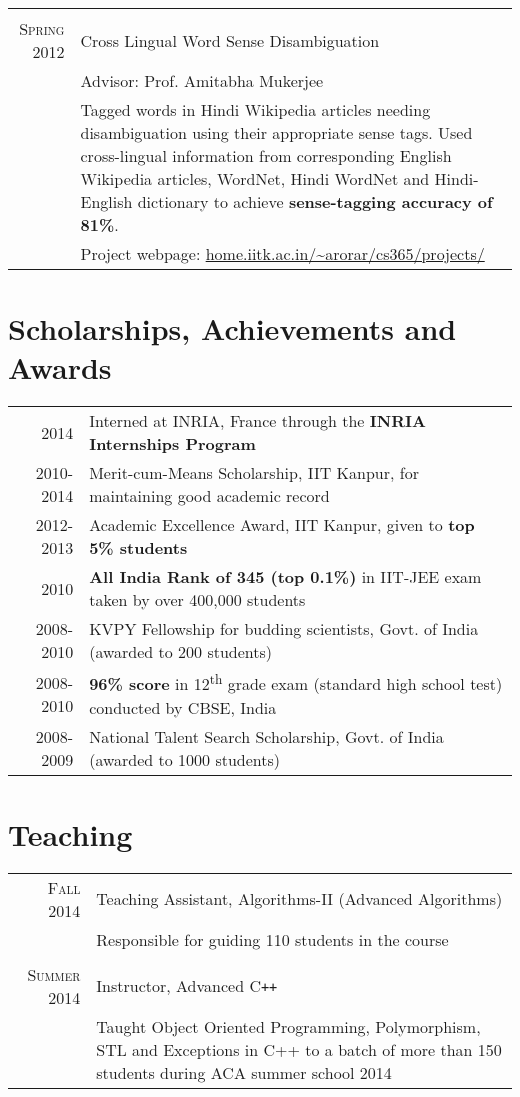\documentclass[a4paper,10pt]{article}
\begin{document}
\begin{longtable}{r|p{12cm}}
\multicolumn{2}{c}{} \\
\textsc{Spring 2012} & Cross Lingual Word Sense Disambiguation\\
&{\small Advisor: Prof. Amitabha Mukerjee}\\
&\small{Tagged words in Hindi Wikipedia articles needing disambiguation using their appropriate sense tags. Used cross-lingual information from corresponding English Wikipedia articles, WordNet, Hindi WordNet and Hindi-English dictionary to achieve \textbf{sense-tagging accuracy of 81\%}}.\\
& \small{Project webpage: \href{http://home.iitk.ac.in/~arorar/cs365/projects/}{home.iitk.ac.in/\textasciitilde arorar/cs365/projects/}}\\
\end{longtable}

\section{Scholarships, Achievements and Awards}
\begin{tabular}{rp{13cm}}
2014 & Interned at INRIA, France through the \textbf{INRIA Internships Program}\\
2010-2014 & Merit-cum-Means Scholarship, IIT Kanpur, for maintaining good academic record\\
2012-2013 & Academic Excellence Award, IIT Kanpur, given to \textbf{top 5\% students}\\
2010 & \textbf{All India Rank of 345 (top 0.1\%)} in IIT-JEE exam taken by over 400,000 students\\
2008-2010 & KVPY Fellowship for budding scientists, Govt. of India (awarded to 200 students)\\
2008-2010 & \textbf{96\% score} in 12\textsuperscript{th} grade exam (standard high school test) conducted by CBSE, India\\
2008-2009 & National Talent Search Scholarship, Govt. of India (awarded to 1000 students)
\end{tabular}

\section{Teaching}
\begin{tabular}{r|p{12cm}}
 \textsc{Fall 2014} & Teaching Assistant, Algorithms-II (Advanced Algorithms)\\
 &\small{Responsible for guiding 110 students in the course}\\ %
 \multicolumn{2}{c}{} \\
 \textsc{Summer 2014} & Instructor, Advanced C\texttt{++}\\
 &\small{Taught Object Oriented Programming, Polymorphism, STL and Exceptions in C++ to a batch of more than 150 students during ACA summer school 2014}\\ %
\end{tabular}
\end{document}
